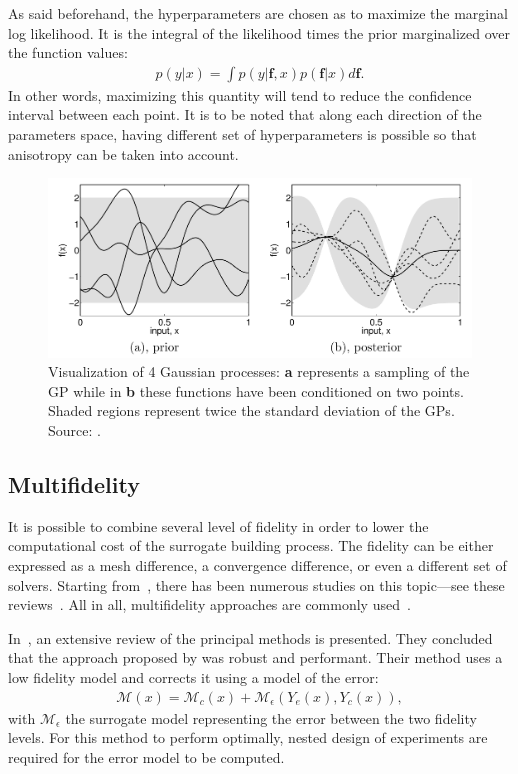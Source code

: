 As said beforehand, the hyperparameters are chosen as to maximize the marginal log likelihood. It is the integral of the likelihood times the prior marginalized over the function values:
\begin{align}
p(y|x) = \int p(y|\mathbf{f}, x)p(\mathbf{f}|x)d\mathbf{f}.
\end{align}
\noindent In other words, maximizing this quantity will tend to reduce the confidence interval between each point. It is to be noted that along each direction of the parameters space, having different set of hyperparameters  is possible so that anisotropy can be taken into account.
~
\begin{figure}[!ht]
\centering
\includegraphics[width=\linewidth,keepaspectratio]{fig/literature/rasmussenGP.png}
\caption{Visualization of 4 Gaussian processes: \textbf{a} represents a sampling of the GP while in \textbf{b} these functions have been conditioned on two points. Shaded regions represent twice the standard deviation of the GPs. Source: \cite{rasmussen2006}.}
\label{fig:gp_prior-post}
\end{figure}

\bigskip
\subsection{Multifidelity}\label{sec:evofusion}

It is possible to combine several level of fidelity in order to lower the computational cost of the surrogate building process. The fidelity can be either expressed as a mesh difference, a convergence difference, or even a different set of solvers. Starting from~\cite{kennedy2000,kennedy2001}, there has been numerous studies on this topic---see these reviews~\cite{legratiet2013,peherstorfer2016,Fernandez2017}. All in all, multifidelity approaches are commonly used~\cite{padron2014,Wang2015,ahlfeld2016}.

In~\cite{courrier2016}, an extensive review of the principal methods is presented. They concluded that the approach proposed by \cite{forrester2006} was robust and performant. Their method uses a low fidelity model and corrects it using a model of the error:
\begin{align}
\mathcal{M}(x) = \mathcal{M}_c(x) + \mathcal{M}_{\epsilon}(Y_e(x), Y_c(x)),
\end{align}
\noindent with $\mathcal{M}_{\epsilon}$ the surrogate model representing the error between the two fidelity levels. For this method to perform optimally, nested design of experiments are required for the error model to be computed.

